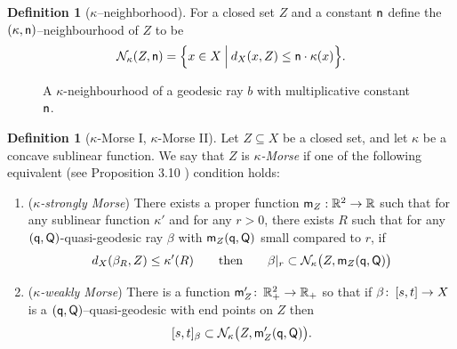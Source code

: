 \documentclass[12 pt]{amsart}
\newcommand{\calN}{\mathcal{N}}
\newcommand{\RR}{\mathbb{R}}
\newcommand{\gothic}{\mathfrak}
\newcommand{\go}{{\gothic o}}
\theoremstyle{definition}
\newtheorem{definition}[theorem]{Definition}
\theoremstyle{remark}
\newcommand{\sQ}{{\sf Q}}
\newcommand{\mm}{{\sf m}}
\newcommand{\nn}{{\sf n}}
\newcommand{\qq}{{\sf q}}
\newcommand{\ST}{\mathbin{\Big|}}
\newcommand{\from}{\colon\thinspace}
\begin{document}
\begin{definition}[$\kappa$--neighborhood]  \label{Def:Neighborhood} 
For a closed set $Z$ and a constant $\nn$ define the $(\kappa, \nn)$--neighbourhood 
of $Z$ to be 
\[
\calN_\kappa(Z, \nn) = \Big\{ x \in X \ST 
  d_X(x, Z) \leq  \nn \cdot \kappa(x)  \Big\}.
\]


\begin{figure}[h]
\caption{A $\kappa$-neighbourhood of a geodesic ray $b$ with multiplicative constant $\nn$.}
\end{figure}
\end{definition}

\begin{definition} [$\kappa$-Morse I, $\kappa$-Morse II] \label{D:k-morse} \label{Def:Morse} 
Let $Z \subseteq X$ be a closed set, and let $\kappa$ be a concave sublinear function. 
We say that $Z$ is \emph{$\kappa$-Morse} if one of the following equivalent (see Proposition 3.10 \cite{QRT2})  condition holds:
\begin{enumerate}

\item[I.] (\emph{$\kappa$-strongly Morse}) There exists a proper function 
$\mm_Z : \mathbb{R}^2 \to \mathbb{R}$ such that for any sublinear function $\kappa'$ 
and for any $r > 0$, there exists $R$ such that for any $(\qq, \sQ)$-quasi-geodesic ray $\beta$
with $\mm_Z(\qq, \sQ)$ small compared to $r$, if 
$$d_X(\beta_R, Z) \leq \kappa'(R)
\qquad\text{then}\qquad
\beta|_r \subset \calN_\kappa \big(Z, \mm_Z(\qq, \sQ)\big)$$


\item[II.](\emph{$\kappa$-weakly Morse})  There is a function $\mm'_Z \from \RR_+^2 \to \RR_+$ so that if $\beta \from [s,t] \to X$ is a $(\qq, \sQ)$--quasi-geodesic with end points 
on $Z$ then
\[
[s,t]_{\beta}  \subset \calN_{\kappa} \big(Z,  \mm'_Z(\qq, \sQ)\big). 
\]
\end{enumerate}
\end{definition} 
\end{document}
